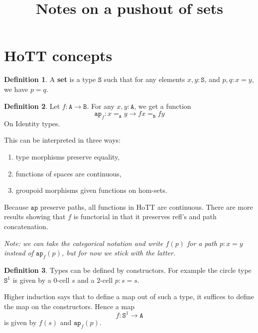 \documentclass[12pt]{amsart}
\newcommand{\from}{\colon}
\newcommand{\type}[1]{\mathtt{#1}}
\newcommand{\tin}{\colon}
\newcommand{\A}{\type{A}}
\newcommand{\B}{\type{B}}
\newcommand{\ap}{\type{ap}}
\theoremstyle{remark}
\theoremstyle{definition}
\newtheorem{defn}{Definition}
\begin{document}
	
\title{Notes on a pushout of sets}
\maketitle


\section{HoTT concepts}

\begin{defn} \label{def:set}
  A \textbf{set} is a type $ \type{S} $
  such that for any elements $ x,y \tin \type{S} $, and
  $ p,q \tin x = y $, we have $ p = q $.
\end{defn}

\begin{defn} \label{def:ap}
  Let $ f \from \A \to \B $.  For any
  $ x,y \tin \A $, we get a function
  \[
    \ap_f \from x =_\A y \to fx =_\B fy
  \]
  On Identity types.
	
  This can be interpreted in three ways:
  \begin{enumerate}
  \item type morphisms preserve equality,
  \item functions of spaces are continuous,
  \item groupoid morphisms given functions on hom-sets.
  \end{enumerate}
  Because $ \ap $ preserve paths, all functions in HoTT are
  continuous.  There are more results showing that $ f $ is functorial
  in that it preserves refl's and path concatenation.
	
  \emph{Note: we can take the categorical notation and write
    $ f ( p ) $ for a path $ p \tin x = y $ instead of
    $ \ap_f ( p ) $, but for now we stick with the latter.}
\end{defn}

\begin{defn} %
	Types can be defined by constructors.
	For example the circle type $ \type{S}^1 $
	is given by a $ 0 $-cell $s$ and 
	a $ 2 $-cell $ p \tin s = s $.
	
	Higher induction says that to define
	a map out of such a type, it suffices
	to define the map on the constructors.
	Hence a map 
	\[
		f \from \type{ S }^1 \to \A
	\] 
	is given by $ f ( s ) $ and 
	$\ap_f ( p )$.
\end{defn}
\end{document}
